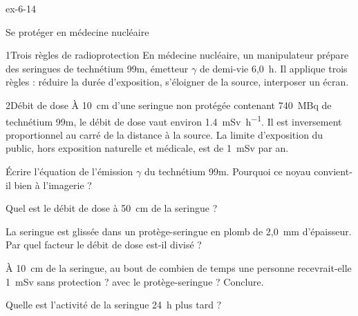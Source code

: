 \begin{blocLivre}{ex-6-14}
\begin{exercice}[3]{Se protéger en médecine nucléaire}
\begin{docu}{1}{Trois règles de radioprotection}
En médecine nucléaire, un manipulateur prépare des seringues de technétium 99m, émetteur $\gamma$ de demi-vie 6,0~h.
Il applique trois règles : réduire la durée d'exposition, s'éloigner de la source, interposer un écran.
\end{docu}
\begin{docu}{2}{Débit de dose}
À 10~cm d'une seringue non protégée contenant 740~MBq de technétium 99m, le débit de dose vaut environ
\qty{1,4}{mSv.h^{-1}}. Il est inversement proportionnel au carré de la distance à la source. La limite d'exposition
du public, hors exposition naturelle et médicale, est de 1~mSv par an.
\end{docu}
\begin{questions}
\item Écrire l'équation de l'émission $\gamma$ du technétium 99m. Pourquoi ce noyau convient-il bien à l'imagerie ?
\item Quel est le débit de dose à 50~cm de la seringue ?
\item La seringue est glissée dans un protège-seringue en plomb de 2,0~mm d'épaisseur. Par quel facteur le débit de
dose est-il divisé ?
\item \initiative À 10~cm de la seringue, au bout de combien de temps une personne recevrait-elle 1~mSv sans
protection ? avec le protège-seringue ? Conclure.
\item Quelle est l'activité de la seringue 24~h plus tard ?
\end{questions}
\end{exercice}
\end{blocLivre}
